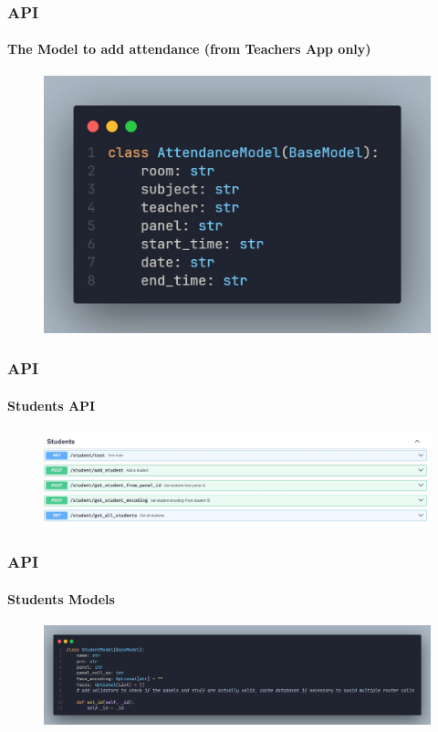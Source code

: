 \documentclass[aspectratio=169]{beamer}
\begin{document}
\begin{frame}
	\centering
	\frametitle{API}
	\framesubtitle{The Model to add attendance (from Teachers App only)}
	\begin{minipage}{0.95\textwidth}
		\begin{figure}[H]
			\centering
			\includegraphics[width=.65\textwidth]{Clipboard Image.jpg}
		\end{figure}
	\end{minipage}
\end{frame}
\begin{frame}
	\centering
	\frametitle{API}
	\framesubtitle{Students API}
	\begin{minipage}{0.95\textwidth}
		\begin{figure}[H]
			\centering
			\includegraphics[width=.95\textwidth]{swagger 2.jpg}
		\end{figure}
	\end{minipage}
\end{frame}
\begin{frame}
	\centering
	\frametitle{API}
	\framesubtitle{Students Models}
	\begin{minipage}{0.95\textwidth}
		\begin{figure}[H]
			\centering
			\includegraphics[width=.99\textwidth]{student.jpg}
		\end{figure}
	\end{minipage}
\end{frame}
\end{document}
